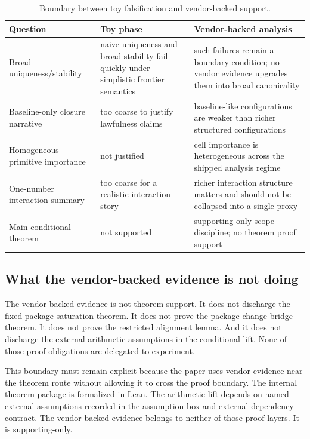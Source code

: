 \documentclass[11pt]{article}
\begin{document}
\begin{table}[t]
\caption{Boundary between toy falsification and vendor-backed support.}
\label{tab:toy-vendor-boundary}
\centering
\small
\begin{tabularx}{\textwidth}{@{}l X X@{}}
\toprule
Question & Toy phase & Vendor-backed analysis \\
\midrule
Broad uniqueness/stability & naive uniqueness and broad stability fail quickly under simplistic frontier semantics & such failures remain a boundary condition; no vendor evidence upgrades them into broad canonicality \\[4pt]
Baseline-only closure narrative & too coarse to justify lawfulness claims & baseline-like configurations are weaker than richer structured configurations \\[4pt]
Homogeneous primitive importance & not justified & cell importance is heterogeneous across the shipped analysis regime \\[4pt]
One-number interaction summary & too coarse for a realistic interaction story & richer interaction structure matters and should not be collapsed into a single proxy \\[4pt]
Main conditional theorem & not supported & supporting-only scope discipline; no theorem proof support \\
\bottomrule
\end{tabularx}
\end{table}

\subsection*{What the vendor-backed evidence is not doing}

The vendor-backed evidence is not theorem support. It does not discharge the
fixed-package saturation theorem. It does not prove the package-change bridge
theorem. It does not prove the restricted alignment lemma. And it does not
discharge the external arithmetic assumptions in the conditional lift. None of
those proof obligations are delegated to experiment.

This boundary must remain explicit because the paper uses vendor evidence near
the theorem route without allowing it to cross the proof boundary. The internal
theorem package is formalized in Lean. The arithmetic lift depends on named
external assumptions recorded in the assumption box and external dependency
contract. The vendor-backed evidence belongs to neither of those proof layers.
It is supporting-only.
\end{document}

